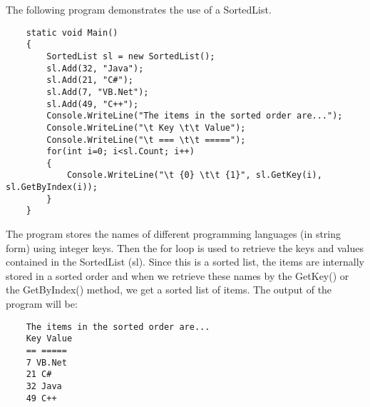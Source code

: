 The following program demonstrates the use of a SortedList.

\begin{lstlisting}
    static void Main()
    {
        SortedList sl = new SortedList();
        sl.Add(32, "Java");
        sl.Add(21, "C#");
        sl.Add(7, "VB.Net");
        sl.Add(49, "C++");
        Console.WriteLine("The items in the sorted order are...");
        Console.WriteLine("\t Key \t\t Value");
        Console.WriteLine("\t === \t\t =====");
        for(int i=0; i<sl.Count; i++)
        {
            Console.WriteLine("\t {0} \t\t {1}", sl.GetKey(i), sl.GetByIndex(i));
        }
    }    
\end{lstlisting}

The program stores the names of different programming languages (in string form) using integer keys. Then the for
loop is used to retrieve the keys and values contained in the SortedList (sl). Since this is a sorted list, the items are
internally stored in a sorted order and when we retrieve these names by the GetKey() or the GetByIndex() method,
we get a sorted list of items. The output of the program will be:

\begin{lstlisting}
    The items in the sorted order are...
    Key Value
    == =====
    7 VB.Net
    21 C#
    32 Java
    49 C++    
\end{lstlisting}
